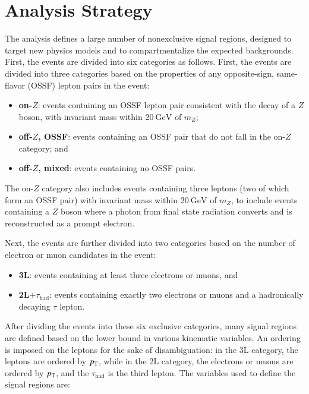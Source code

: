 \section{Analysis Strategy}\label{sec:model-independent-analysis-strategy}
The analysis defines a large number of nonexclusive signal regions, designed to target new physics models and to compartmentalize the expected backgrounds. First, the events are divided into six categories as follows. First, the events are divided into three categories based on the properties of any opposite-sign, same-flavor (OSSF) lepton pairs in the event:

\begin{itemize}
	\item \textbf{on-$Z$}: events containing an OSSF lepton pair consistent with the decay of a $Z$ boson, with invariant mass within $\SI{20}{\giga\electronvolt}$ of $m_Z$;
	\item \textbf{off-$Z$, OSSF}:  events containing an OSSF pair that do not fall in the on-$Z$ category; and
	\item \textbf{off-$Z$, mixed}: events containing no OSSF pairs.
\end{itemize}

The on-$Z$ category also includes events containing three leptons (two of which form an OSSF pair) with invariant mass within $\SI{20}{\giga\electronvolt}$ of $m_Z$, to include events containing a $Z$ boson where a photon from final state radiation converts and is reconstructed as a prompt electron.

Next, the events are further divided into two categories based on the number of electron or muon candidates in the event:

\begin{itemize}
	\item \textbf{3L}: events containing at least three electrons or muons, and
	\item \textbf{2L$+\tau_{\mathrm{had}}$}: events containing exactly two electrons or muons and a hadronically decaying $\tau$ lepton.
\end{itemize}

After dividing the events into these six exclusive categories, many signal regions are defined based on the lower bound in various kinematic variables. An ordering is imposed on the leptons for the sake of disambiguation: in the 3L category, the leptons are ordered by $p_{\text{T}}$, while in the 2L category, the electrons or muons are ordered by $p_{\text{T}}$, and the $\tau_{\mathrm{had}}$ is the third lepton.  The variables used to define the signal regions are:

